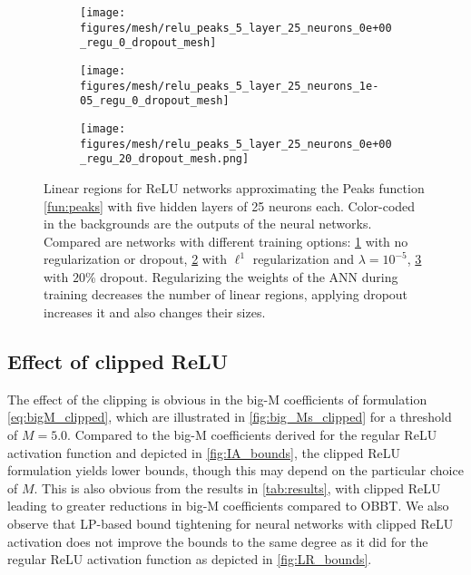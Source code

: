 \begin{figure}
    \centering
    \begin{subfigure}{.32\linewidth}
        \centering
        \texttt{[image: figures/mesh/relu\_peaks\_5\_layer\_25\_neurons\_0e+00\_regu\_0\_dropout\_mesh]}
        \label{subfig:mesh_no_regu}
    \end{subfigure}
    \begin{subfigure}{.32\linewidth}
        \centering
        \texttt{[image: figures/mesh/relu\_peaks\_5\_layer\_25\_neurons\_1e-05\_regu\_0\_dropout\_mesh]}
        \label{subfig:mesh_regu}
    \end{subfigure}
    \begin{subfigure}{.32\linewidth}
        \centering
        \texttt{[image: figures/mesh/relu\_peaks\_5\_layer\_25\_neurons\_0e+00\_regu\_20\_dropout\_mesh.png]}
        \label{subfig:mesh_dropout}
    \end{subfigure}
    \caption{Linear regions for ReLU networks approximating the Peaks function \eqref{fun:peaks} with five hidden layers of 25 neurons each. Color-coded in the backgrounds are the outputs of the neural networks. Compared are networks with different training options: \cref{subfig:mesh_no_regu} with no regularization or dropout, \cref{subfig:mesh_regu} with $\ell^1$ regularization and $\lambda=10^{-5}$, \cref{subfig:mesh_dropout} with $20$\% dropout. Regularizing the weights of the ANN during training decreases the number of linear regions, applying dropout increases it and also changes their sizes.}
    \label{fig:linear_regions}
\end{figure}


\subsection{Effect of clipped ReLU}

The effect of the clipping is obvious in the big-M coefficients of formulation \eqref{eq:bigM_clipped}, which are illustrated in \vref{fig:big_Ms_clipped} for a threshold of $M=5.0$. Compared to the big-M coefficients derived for the regular ReLU activation function and depicted in \vref{fig:IA_bounds}, the clipped ReLU formulation yields lower bounds, though this may depend on the particular choice of $M$. This is also obvious from the results in \vref{tab:results}, with clipped ReLU leading to greater reductions in big-M coefficients compared to OBBT. We also observe that LP-based bound tightening for neural networks with clipped ReLU activation does not improve the bounds to the same degree as it did for the regular ReLU activation function as depicted in \vref{fig:LR_bounds}.

